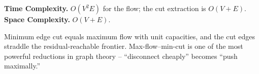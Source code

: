 \begin{complexitybox}
\textbf{Time Complexity.} $O(V^2E)$ for the flow; the cut extraction is
$O(V+E)$. \textbf{Space Complexity.} $O(V+E)$.
\end{complexitybox}

\begin{takeawaybox}
Minimum edge cut equals maximum flow with unit capacities, and the cut edges
straddle the residual-reachable frontier. Max-flow--min-cut is one of the
most powerful reductions in graph theory -- ``disconnect cheaply'' becomes
``push maximally.''
\end{takeawaybox}
